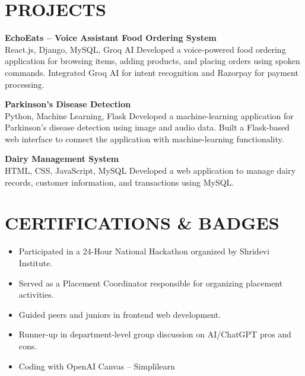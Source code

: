 \documentclass[8.5pt,a4paper]{extarticle}
\begin{document}
\section*{PROJECTS}
{\small \noindent \textbf{EchoEats – Voice Assistant Food Ordering System} \\
React.js, Django, MySQL, Groq AI Developed a voice-powered food ordering application for browsing items, adding products, and placing orders using spoken commands. Integrated Groq AI for intent recognition and Razorpay for payment processing. \vspace{4pt}

\noindent \textbf{Parkinson’s Disease Detection} \\
Python, Machine Learning, Flask Developed a machine-learning application for Parkinson’s disease detection using image and audio data. Built a Flask-based web interface to connect the application with machine-learning functionality. \vspace{4pt}

\noindent \textbf{Dairy Management System} \\
HTML, CSS, JavaScript, MySQL Developed a web application to manage dairy records, customer information, and transactions using MySQL. \vspace{4pt}

}
\section*{CERTIFICATIONS \& BADGES}
\begin{itemize}[leftmargin=0.2in, itemsep=1pt, topsep=1pt]
    \item Participated in a 24-Hour National Hackathon organized by Shridevi Institute.
    \item Served as a Placement Coordinator responsible for organizing placement activities.
    \item Guided peers and juniors in frontend web development.
    \item Runner-up in department-level group discussion on AI/ChatGPT pros and cons.
    \item Coding with OpenAI Canvas – Simplilearn
\end{itemize}
\end{document}
